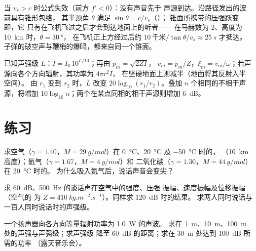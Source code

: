 \begin{remark}[超音速]\label{rem:b2:sound-waves:mach}
当 $v_s > c$ 时公式失效（前方 $f' < 0$）：没有声音先于
声源到达。沿路径发出的波前具有锥形包络，
其半顶角 $\theta$ 满足 $\sin\theta = c/v_s$（\emph{}）；
锥面所携带的压强跃变即，它
只有在飞机飞过之后才会到达地面上的听者——
在马赫数为 $2$、高度为 \qty{10}{km} 时，$\theta = \qty{30}{\degree}$，
在飞机正上方经过后约 $10\,\text{千米}/\tan\theta/v_s \approx \qty{25}{s}$ 才抵达。
子弹的破空声与鞭梢的爆鸣，都来自同一个锥面。
\end{remark}

\begin{method}[声学中的数量级]\label{met:b2:sound-waves:method}
已知声强级 $L$：$I = I_0\,10^{L/10}$；再由 $p_m = \sqrt{2ZI}$，
$v_m = p_m/Z$，$\xi_m = v_m/\omega$；若声源向各个方向辐射，其功率为 $4\pi r^2I$，
在坚硬地面上则减半（地面将其反射入半空间）。
由 $r_1$ 变到 $r_2$ 时，$L$ 改变
$20\log_{10}(r_1/r_2)$。叠加 $n$ 个相同的不相干声源，将增加
$10\log_{10}n$；两个在某点同相的相干声源则增加 \qty{6}{dB}。
\end{method}

\section{练习}

\begin{exercise}[$\star$]\label{exo:b2:sound-waves:1}
求空气（$\gamma = 1.40$，$M = \qty{29}{g/mol}$）在
\qty{0}{\degreeCelsius}、\qty{20}{\degreeCelsius} 及 \qty{-50}{\degreeCelsius} 时的，
（\qty{10}{km} 高度）；氦气（$\gamma = 1.67$，$M = \qty{4}{g/mol}$）和
二氧化碳（$\gamma = 1.30$，$M = \qty{44}{g/mol}$）在 \qty{20}{\degreeCelsius} 时的。
为什么吸入氦气后，说话声音会变尖？
\end{exercise}

\begin{exercise}[$\star$]\label{exo:b2:sound-waves:2}
求 \qty{60}{dB}、\qty{500}{Hz} 的谈话声在空气中的强度、压强
振幅、速度振幅及位移振幅（空气的
为 $Z = \qty{410}{kg.m^{-2}.s^{-1}}$）。同样求 \qty{120}{dB} 时的结果。
求两人同时说话与一百人同时说话时的声强级。
\end{exercise}

\begin{exercise}[$\star$]\label{exo:b2:sound-waves:3}
一个扬声器向各方向等量辐射功率为 \qty{1.0}{W} 的声波。
求在 \qty{1}{m}、\qty{10}{m}、\qty{100}{m} 处的声强与声强级；求声强级
降至 \qty{60}{dB} 的距离；求在 \qty{30}{m} 处达到 \qty{100}{dB} 所需的功率
（露天音乐会）。
\end{exercise}

